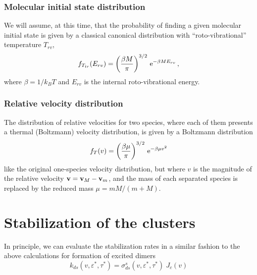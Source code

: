 \subsubsection{Molecular initial state distribution}

We will assume, at this time, that the probability of finding a given molecular initial state is given by a classical canonical distribution with ``roto-vibrational'' temperature $T_{rv}$,
\begin{equation}
  \label{Q:rates-rotovib-distrib}
  f_{T_{tr}}(E_{rv}) = \left( \frac{\beta M}{\pi} \right)^{3/2} \, \mathrm{e}^{- \beta M E_{rv}} \,,
\end{equation}
where $\beta= 1/k_{B}T$ and $E_{rv}$ is the internal roto-vibrational energy.

\subsubsection{Relative velocity distribution}

The distribution of relative velocities for two species, where each of them presents a thermal (Boltzmann) velocity distribution, is given by a Boltzmann distribution
\begin{equation}
  \label{Q:rates-relat-veloc-distrib}
  f_{T}(v) = \left( \frac{\beta \mu}{\pi} \right)^{3/2} \, \mathrm{e}^{- \beta \mu v^{2}}
\end{equation}
like the original one-species velocity distribution, but where $v$ is the magnitude of the relative velocity $\mathbf{v} = \mathbf{v}_{M}- \mathbf{v}_{m}$, and the mass of each separated species is replaced by the reduced mass $\mu = m M /(m + M)$.


\section{Stabilization of the clusters}
\label{S:stabil-cluster}

In principle, we can evaluate the stabilization rates in a similar fashion to the above calculations for formation of excited dimers
\begin{equation}
  \label{Q:rates-def-stabil-rate}
    k_{ds}(v , \varepsilon^{*}, \tau^{*}) = \sigma_{ds}^{s}(v, \varepsilon^{*}, \tau^{*}) \; J_{c}(v )
\end{equation}



